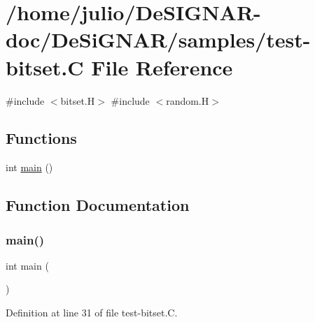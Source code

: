 \hypertarget{test-bitset_8_c}{}\section{/home/julio/\+De\+S\+I\+G\+N\+A\+R-\/doc/\+De\+Si\+G\+N\+A\+R/samples/test-\/bitset.C File Reference}
\label{test-bitset_8_c}
{\ttfamily \#include $<$bitset.\+H$>$}\newline
{\ttfamily \#include $<$random.\+H$>$}\newline
\subsection*{Functions}
\begin{DoxyCompactItemize}
\item 
int \hyperlink{test-bitset_8_c_ae66f6b31b5ad750f1fe042a706a4e3d4}{main} ()
\end{DoxyCompactItemize}


\subsection{Function Documentation}
\mbox{\label{test-bitset_8_c_ae66f6b31b5ad750f1fe042a706a4e3d4}} 
\subsubsection{\texorpdfstring{main()}{main()}}
{\footnotesize\ttfamily int main (\begin{DoxyParamCaption}{ }\end{DoxyParamCaption})}



Definition at line 31 of file test-\/bitset.\+C.

